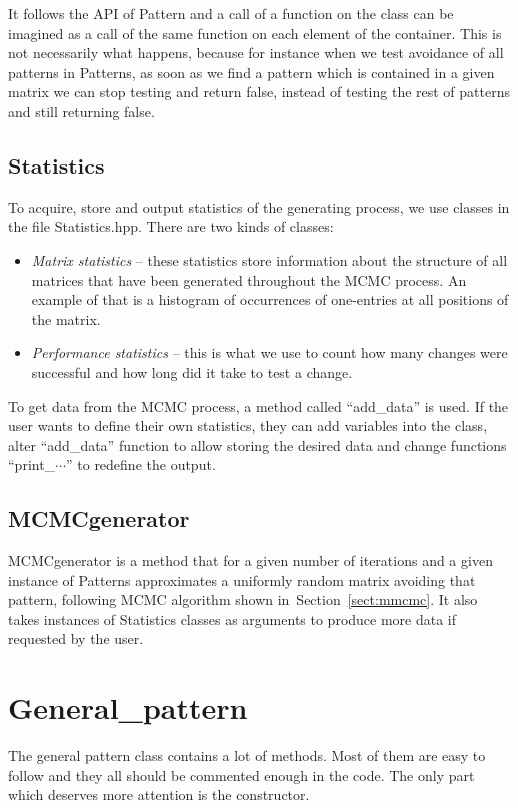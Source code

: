 It follows the API of Pattern and a call of a function on the class can be imagined as a call of the same function on each element of the container. This is not necessarily what happens, because for instance when we test avoidance of all patterns in Patterns, as soon as we find a pattern which is contained in a given matrix we can stop testing and return false, instead of testing the rest of patterns and still returning false.

\subsection{Statistics}
To acquire, store and output statistics of the generating process, we use classes in the file Statistics.hpp. There are two kinds of classes:
\begin{itemize}
\item \emph{Matrix statistics} -- these statistics store information about the structure of all matrices that have been generated throughout the MCMC process. An example of that is a histogram of occurrences of one-entries at all positions of the matrix.
\item \emph{Performance statistics} -- this is what we use to count how many changes were successful and how long did it take to test a change.
\end{itemize}

To get data from the MCMC process, a method called ``add\_data'' is used. If the user wants to define their own statistics, they can add variables into the class, alter ``add\_data'' function to allow storing the desired data and change functions ``print\_$\cdots$'' to redefine the output.

\subsection{MCMCgenerator}
MCMCgenerator is a method that for a given number of iterations and a given instance of Patterns approximates a uniformly random matrix avoiding that pattern, following MCMC algorithm shown in~Section~\ref{sect:mmcmc}. It also takes instances of Statistics classes as arguments to produce more data if requested by the user.

\section{General\_pattern}
The general pattern class contains a lot of methods. Most of them are easy to follow and they all should be commented enough in the code. The only part which deserves more attention is the constructor.

